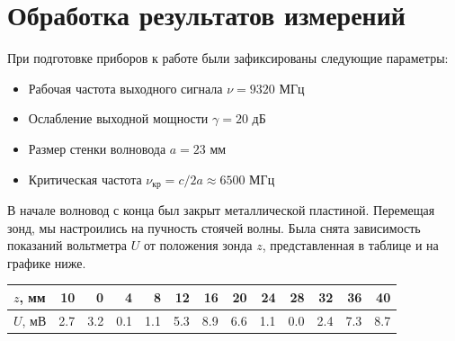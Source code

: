 \section*{Обработка результатов измерений}
При подготовке приборов к работе были зафиксированы следующие параметры:
\begin{itemize}
\item Рабочая частота выходного сигнала $\nu = 9320$ МГц
\item Ослабление выходной мощности $\gamma = 20$ дБ
\item Размер стенки волновода $a = 23$ мм
\item Критическая частота $\nu_{\text{кр}} = c / 2a \approx 6500$ МГц
\end{itemize}
\n
В начале волновод с конца был закрыт металлической пластиной. Перемещая зонд, мы настроились на пучность стоячей волны. Была снята зависимость показаний вольтметра $U$ от положения зонда $z$, представленная в таблице и на графике ниже.

\begin{table}[H]
\centering
\begin{tabular}{|l|r|r|r|r|r|r|r|r|r|r|r|r|}
\hline
$z$, мм & 10   & 0    & 4   & 8    & 12   & 16   & 20   & 24   & 28 & 32   & 36   & 40   \\ \hline
$U$, мВ & 2.7 & 3.2 & 0.1 & 1.1 & 5.3 & 8.9 & 6.6 & 1.1 & 0.0  & 2.4 & 7.3 & 8.7 \\ \hline
\end{tabular}
\end{table}

